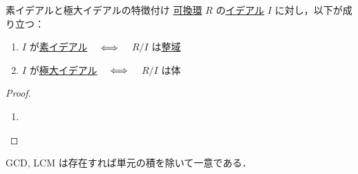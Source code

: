 \documentclass[rep_main]{subfiles}
\begin{document}
\begin{myprop}[label=prop:ideal-ring-basic]{素イデアルと極大イデアルの特徴付け}
    \underline{可換環} $R$ の\hyperref[def:ideal-ring]{イデアル} $I$ に対し，以下が成り立つ：
    \begin{enumerate}
        \item $I$ が\hyperref[def:ideal-ring]{素イデアル} $\quad \Longleftrightarrow \quad$ $R/I$ は\hyperref[def:domain-basic]{整域}
        \item $I$ が\hyperref[def:ideal-ring]{極大イデアル} $\quad \Longleftrightarrow \quad$ $R/I$ は体
    \end{enumerate}
\end{myprop}

\begin{proof}
    \begin{enumerate}
        \item 
    \end{enumerate}
\end{proof}

GCD, LCM は存在すれば単元の積を除いて一意である．
\end{document}
